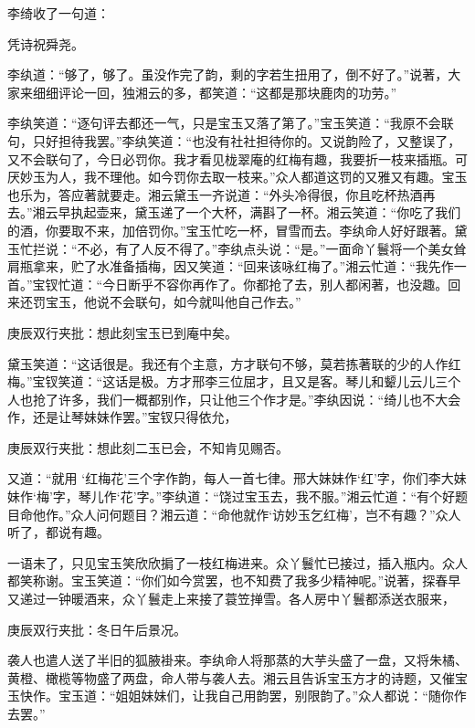 \begin{parag}
    李绮收了一句道：
\end{parag}


\begin{poem}
    \begin{pl} 凭诗祝舜尧。\end{pl}
\end{poem}


\begin{parag}
    李纨道：“够了，够了。虽没作完了韵，剩的字若生扭用了，倒不好了。”说著，大家来细细评论一回，独湘云的多，都笑道：“这都是那块鹿肉的功劳。”
\end{parag}


\begin{parag}
    李纨笑道：“逐句评去都还一气，只是宝玉又落了第了。”宝玉笑道：“我原不会联句，只好担待我罢。”李纨笑道：“也没有社社担待你的。又说韵险了，又整误了，又不会联句了，今日必罚你。我才看见栊翠庵的红梅有趣，我要折一枝来插瓶。可厌妙玉为人，我不理他。如今罚你去取一枝来。”众人都道这罚的又雅又有趣。宝玉也乐为，答应著就要走。湘云黛玉一齐说道：“外头冷得很，你且吃杯热酒再去。”湘云早执起壶来，黛玉递了一个大杯，满斟了一杯。湘云笑道：“你吃了我们的酒，你要取不来，加倍罚你。”宝玉忙吃一杯，冒雪而去。李纨命人好好跟著。黛玉忙拦说：“不必，有了人反不得了。”李纨点头说：“是。”一面命丫鬟将一个美女耸肩瓶拿来，贮了水准备插梅，因又笑道：“回来该咏红梅了。”湘云忙道：“我先作一首。”宝钗忙道：“今日断乎不容你再作了。你都抢了去，别人都闲著，也没趣。回来还罚宝玉，他说不会联句，如今就叫他自己作去。”\begin{note}庚辰双行夹批：想此刻宝玉已到庵中矣。\end{note}黛玉笑道：“这话很是。我还有个主意，方才联句不够，莫若拣著联的少的人作红梅。”宝钗笑道：“这话是极。方才邢李三位屈才，且又是客。琴儿和颦儿云儿三个人也抢了许多，我们一概都别作，只让他三个作才是。”李纨因说：“绮儿也不大会作，还是让琴妹妹作罢。”宝钗只得依允，\begin{note}庚辰双行夹批：想此刻二玉已会，不知肯见赐否。\end{note}又道：“就用 ‘红梅花’三个字作韵，每人一首七律。邢大妹妹作‘红’字，你们李大妹妹作‘梅’字，琴儿作‘花’字。”李纨道：“饶过宝玉去，我不服。”湘云忙道：“有个好题目命他作。”众人问何题目？湘云道：“命他就作‘访妙玉乞红梅’，岂不有趣？”众人听了，都说有趣。
\end{parag}


\begin{parag}
    一语未了，只见宝玉笑欣欣掮了一枝红梅进来。众丫鬟忙已接过，插入瓶内。众人都笑称谢。宝玉笑道：“你们如今赏罢，也不知费了我多少精神呢。”说著，探春早又递过一钟暖酒来，众丫鬟走上来接了蓑笠掸雪。各人房中丫鬟都添送衣服来，\begin{note}庚辰双行夹批：冬日午后景况。\end{note}袭人也遣人送了半旧的狐腋褂来。李纨命人将那蒸的大芋头盛了一盘，又将朱橘、黄橙、橄榄等物盛了两盘，命人带与袭人去。湘云且告诉宝玉方才的诗题，又催宝玉快作。宝玉道：“姐姐妹妹们，让我自己用韵罢，别限韵了。”众人都说：“随你作去罢。”
\end{parag}


